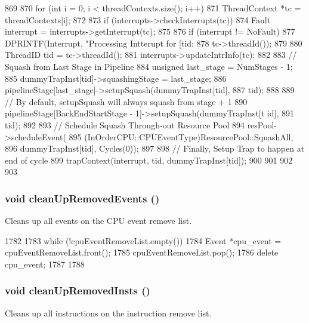 \begin{DoxyCode}
869 {
870     for (int i = 0; i < threadContexts.size(); i++) {
871         ThreadContext *tc = threadContexts[i];
872 
873         if (interrupts->checkInterrupts(tc)) {
874             Fault interrupt = interrupts->getInterrupt(tc);
875 
876             if (interrupt != NoFault) {
877                 DPRINTF(Interrupt, "Processing Intterupt for [tid:%
878                         tc->threadId());
879 
880                 ThreadID tid = tc->threadId();
881                 interrupts->updateIntrInfo(tc);
882 
883                 // Squash from Last Stage in Pipeline
884                 unsigned last_stage = NumStages - 1;
885                 dummyTrapInst[tid]->squashingStage = last_stage;
886                 pipelineStage[last_stage]->setupSquash(dummyTrapInst[tid],
887                                                        tid);
888 
889                 // By default, setupSquash will always squash from stage + 1
890                 pipelineStage[BackEndStartStage - 1]->setupSquash(dummyTrapInst[t
      id],
891                                                                   tid);
892 
893                 // Schedule Squash Through-out Resource Pool
894                 resPool->scheduleEvent(
895                     (InOrderCPU::CPUEventType)ResourcePool::SquashAll,
896                     dummyTrapInst[tid], Cycles(0));
897 
898                 // Finally, Setup Trap to happen at end of cycle
899                 trapContext(interrupt, tid, dummyTrapInst[tid]);
900             }
901         }
902     }
903 }
\end{DoxyCode}
\hypertarget{classInOrderCPU_a39643f756fba31f4194c22164dce65cd}{
\subsubsection[{cleanUpRemovedEvents}]{\setlength{\rightskip}{0pt plus 5cm}void cleanUpRemovedEvents ()}}
\label{classInOrderCPU_a39643f756fba31f4194c22164dce65cd}
Cleans up all events on the CPU event remove list. 


\begin{DoxyCode}
1782 {
1783     while (!cpuEventRemoveList.empty()) {
1784         Event *cpu_event = cpuEventRemoveList.front();
1785         cpuEventRemoveList.pop();
1786         delete cpu_event;
1787     }
1788 }
\end{DoxyCode}
\hypertarget{classInOrderCPU_a7bc351a2a79efb6dc9f88f8a6a2ed33c}{
\subsubsection[{cleanUpRemovedInsts}]{\setlength{\rightskip}{0pt plus 5cm}void cleanUpRemovedInsts ()}}
\label{classInOrderCPU_a7bc351a2a79efb6dc9f88f8a6a2ed33c}
Cleans up all instructions on the instruction remove list. 


